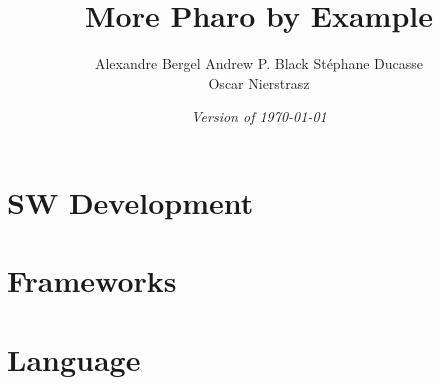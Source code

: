 \documentclass[a4paper,10pt,twoside]{book}
\begin{document}
\frontmatter
\setcounter{page}{1}
\pagestyle{headings}
\author{
	Alexandre Bergel\quad
	Andrew P. Black\quad
	St\'ephane Ducasse\\[1ex]
	Oscar Nierstrasz\quad}
\title{\Huge\bf More Pharo by Example\\[1ex]}
\isodate
\date{\emph{Version of \today}}
\maketitle
\tableofcontents
\sloppy %
\mainmatter

\part{SW Development}





\part{Frameworks}





\part{Language}








\printindex
\end{document}
